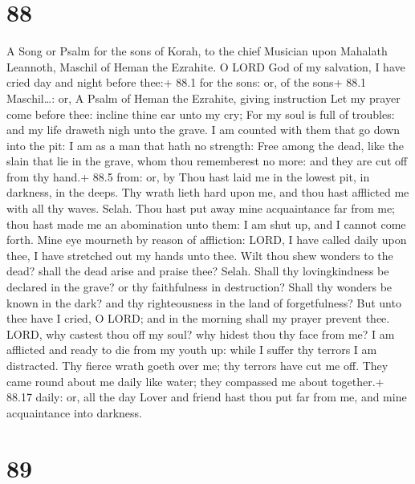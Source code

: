\hypertarget{section-87}{%
\section{88}\label{section-87}}

A Song or Psalm for the sons of Korah, to the chief Musician upon
Mahalath Leannoth, Maschil of Heman the Ezrahite.  O LORD
God of my salvation, I have cried day and night before thee:+ 88.1 for
the sons: or, of the sons+ 88.1 Maschil\ldots: or, A Psalm of Heman the
Ezrahite, giving instruction  Let my prayer come before
thee: incline thine ear unto my cry;  For my soul is full of
troubles: and my life draweth nigh unto the grave.  I am
counted with them that go down into the pit: I am as a man that hath no
strength:  Free among the dead, like the slain that lie in
the grave, whom thou rememberest no more: and they are cut off from thy
hand.+ 88.5 from: or, by  Thou hast laid me in the lowest
pit, in darkness, in the deeps.  Thy wrath lieth hard upon
me, and thou hast afflicted me with all thy waves. Selah. 
Thou hast put away mine acquaintance far from me; thou hast made me an
abomination unto them: I am shut up, and I cannot come forth.
 Mine eye mourneth by reason of affliction: LORD, I have
called daily upon thee, I have stretched out my hands unto thee.
 Wilt thou shew wonders to the dead? shall the dead arise
and praise thee? Selah.  Shall thy lovingkindness be
declared in the grave? or thy faithfulness in destruction? 
Shall thy wonders be known in the dark? and thy righteousness in the
land of forgetfulness?  But unto thee have I cried, O LORD;
and in the morning shall my prayer prevent thee.  LORD, why
castest thou off my soul? why hidest thou thy face from me?
 I am afflicted and ready to die from my youth up: while I
suffer thy terrors I am distracted.  Thy fierce wrath goeth
over me; thy terrors have cut me off.  They came round
about me daily like water; they compassed me about together.+ 88.17
daily: or, all the day  Lover and friend hast thou put far
from me, and mine acquaintance into darkness.

\hypertarget{section-88}{%
\section{89}\label{section-88}}

